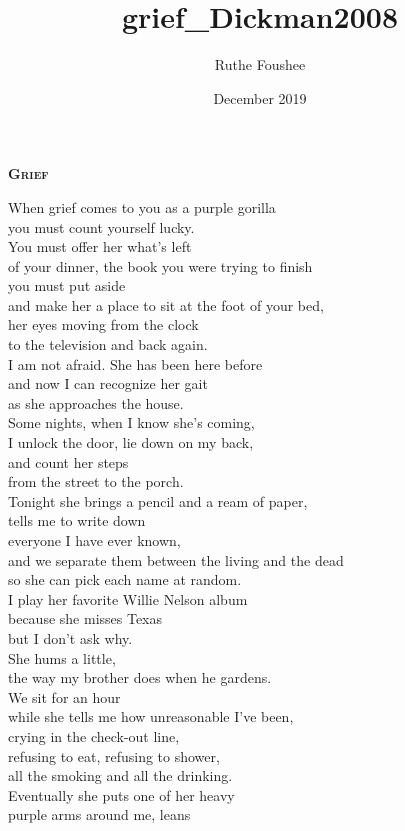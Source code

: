 \documentclass{memoir}
\title{grief_Dickman2008}
\author{Ruthe Foushee}
\date{December 2019}
\begin{document}
\thispagestyle{empty} %
\noindent \textbf{\textsc{\Large Grief}}
\vspace{18pt}

When grief comes to you as a purple gorilla\\
you must count yourself lucky.\\
You must offer her what's left\\
of your dinner, the book you were trying to finish\\
you must put aside\\
and make her a place to sit at the foot of your bed,\\
her eyes moving from the clock\\
to the television and back again.\\
I am not afraid. She has been here before\\
and now I can recognize her gait\\
as she approaches the house.\\
Some nights, when I know she's coming,\\
I unlock the door, lie down on my back,\\
and count her steps\\
from the street to the porch.\\
Tonight she brings a pencil and a ream of paper,\\
tells me to write down\\
everyone I have ever known,\\
and we separate them between the living and the dead\\
so she can pick each name at random.\\
I play her favorite Willie Nelson album\\
because she misses Texas\\
but I don't ask why.\\
She hums a little,\\
the way my brother does when he gardens.\\
We sit for an hour\\
while she tells me how unreasonable I've been,\\
crying in the check-out line,\\
refusing to eat, refusing to shower,\\
all the smoking and all the drinking.\\
Eventually she puts one of her heavy\\
purple arms around me, leans\\
\end{document}
